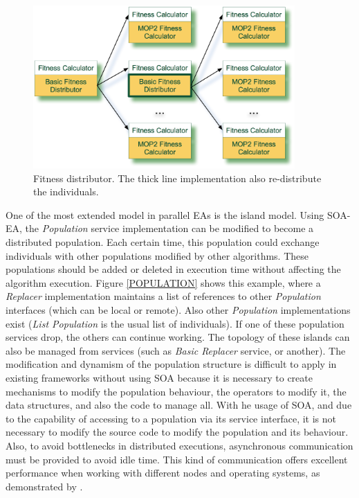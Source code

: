 \begin{figure}
\centering
\includegraphics[width=10cm]{gfx/soaea/distributor.jpg}
\caption{Fitness distributor. The thick line implementation also re-distribute the individuals.}
\label{FITNESSDISTRIBUTOR}
\end{figure}



One of the most extended model in parallel EAs is the island model. Using SOA-EA, the {\em Population} service implementation can be modified to become a distributed population. Each certain time, this population could exchange individuals with other populations modified by other algorithms. These populations should be added or deleted in execution time without affecting the algorithm execution. Figure \ref{POPULATION} shows this example, where a {\em Replacer} implementation maintains a list of references to other {\em Population} interfaces (which can be local or remote). Also other {\em Population} implementations exist ({\em List Population} is the usual list of individuals). If one of these population services drop, the others can continue working. The topology of these islands can also be managed from services (such as {\em Basic Replacer} service, or another). The  modification and dynamism of the population structure is difficult to apply in existing frameworks without using SOA because it is necessary to create mechanisms to modify the population behaviour, the operators to modify it, the data structures, and also the code to manage all. With he usage of SOA, and due to the capability of accessing to a population via its service interface, it is not necessary to modify the source code to modify the population and its behaviour. Also, to avoid bottlenecks in distributed executions, asynchronous communication must be provided to avoid idle time. This kind of communication offers excellent performance when working with different nodes and operating systems, as demonstrated by \cite{Alba2002Heterogeneous}.




